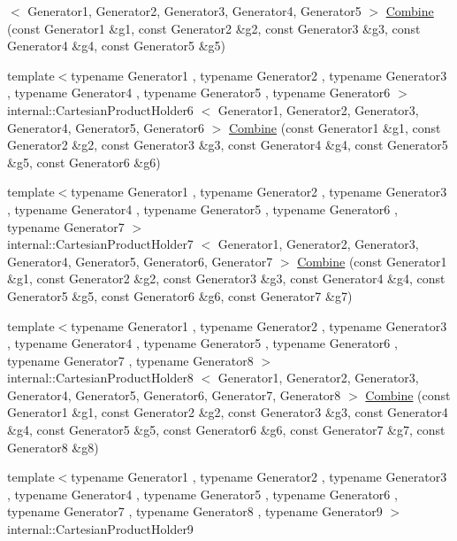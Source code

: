 \begin{DoxyCompactItemize}
$<$ \-Generator1, \-Generator2, \*
\-Generator3, \-Generator4, \*
\-Generator5 $>$ \hyperlink{namespacetesting_a81505186d64f5b5763a0e268bc2e5650}{\-Combine} (const \-Generator1 \&g1, const \-Generator2 \&g2, const \-Generator3 \&g3, const \-Generator4 \&g4, const \-Generator5 \&g5)
\item 
{\footnotesize template$<$typename Generator1 , typename Generator2 , typename Generator3 , typename Generator4 , typename Generator5 , typename Generator6 $>$ }\\internal\-::\-Cartesian\-Product\-Holder6\*
$<$ \-Generator1, \-Generator2, \*
\-Generator3, \-Generator4, \*
\-Generator5, \-Generator6 $>$ \hyperlink{namespacetesting_adccda33f9b3ad18896cb341979fe12b4}{\-Combine} (const \-Generator1 \&g1, const \-Generator2 \&g2, const \-Generator3 \&g3, const \-Generator4 \&g4, const \-Generator5 \&g5, const \-Generator6 \&g6)
\item 
{\footnotesize template$<$typename Generator1 , typename Generator2 , typename Generator3 , typename Generator4 , typename Generator5 , typename Generator6 , typename Generator7 $>$ }\\internal\-::\-Cartesian\-Product\-Holder7\*
$<$ \-Generator1, \-Generator2, \*
\-Generator3, \-Generator4, \*
\-Generator5, \-Generator6, \*
\-Generator7 $>$ \hyperlink{namespacetesting_a314759a93c251ca78b75c7f3ae8eda80}{\-Combine} (const \-Generator1 \&g1, const \-Generator2 \&g2, const \-Generator3 \&g3, const \-Generator4 \&g4, const \-Generator5 \&g5, const \-Generator6 \&g6, const \-Generator7 \&g7)
\item 
{\footnotesize template$<$typename Generator1 , typename Generator2 , typename Generator3 , typename Generator4 , typename Generator5 , typename Generator6 , typename Generator7 , typename Generator8 $>$ }\\internal\-::\-Cartesian\-Product\-Holder8\*
$<$ \-Generator1, \-Generator2, \*
\-Generator3, \-Generator4, \*
\-Generator5, \-Generator6, \*
\-Generator7, \-Generator8 $>$ \hyperlink{namespacetesting_ac5508abb9d05e22332c792d101c13b2b}{\-Combine} (const \-Generator1 \&g1, const \-Generator2 \&g2, const \-Generator3 \&g3, const \-Generator4 \&g4, const \-Generator5 \&g5, const \-Generator6 \&g6, const \-Generator7 \&g7, const \-Generator8 \&g8)
\item 
{\footnotesize template$<$typename Generator1 , typename Generator2 , typename Generator3 , typename Generator4 , typename Generator5 , typename Generator6 , typename Generator7 , typename Generator8 , typename Generator9 $>$ }\\internal\-::\-Cartesian\-Product\-Holder9\*

\end{DoxyCompactItemize}

